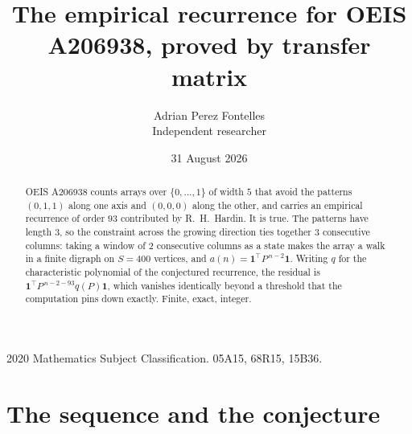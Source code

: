 \documentclass[11pt,a4paper]{article}
\title{The empirical recurrence for OEIS A206938, proved by transfer matrix}
\author{Adrian Perez Fontelles\\ \small Independent researcher}
\date{31 August 2026}
\theoremstyle{plain}
\theoremstyle{definition}
\begin{document}
\maketitle

\begin{abstract}
OEIS A206938 counts arrays over $\{0,\dots,1\}$ of width $5$ that avoid the patterns
$(0,1,1)$ along one axis and $(0,0,0)$ along the other, and carries an empirical recurrence of
order $93$ contributed by R.~H.~Hardin. It is true. The patterns have length $3$, so
the constraint across the growing direction ties together $3$ consecutive columns: taking a
window of $2$ consecutive columns as a state makes the array a walk in a finite digraph
on $S=400$ vertices, and $a(n)=\mathbf{1}^{\!\top}P^{\,n-2}\mathbf{1}$. Writing $q$
for the characteristic polynomial of the conjectured recurrence, the residual is
$\mathbf{1}^{\!\top}P^{\,n-2-93}q(P)\mathbf{1}$, which vanishes identically
beyond a threshold that the computation pins down exactly. Finite, exact, integer.
\end{abstract}

\noindent\small 2020 Mathematics Subject Classification. 05A15, 68R15, 15B36.\normalsize

\section{The sequence and the conjecture}
\end{document}
